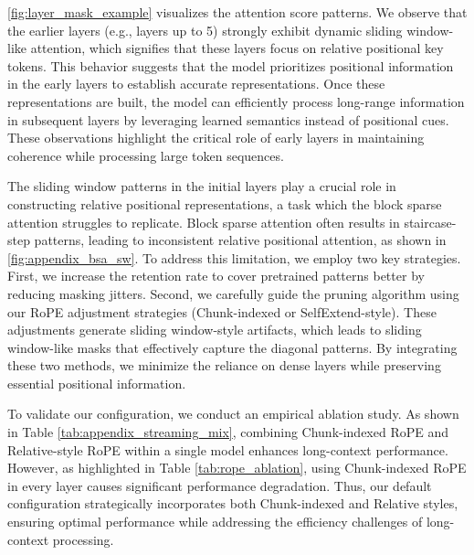 

\cref{fig:layer_mask_example} visualizes the attention score patterns. We observe that the earlier layers (e.g., layers up to 5) strongly exhibit dynamic sliding window-like attention, which signifies that these layers focus on relative positional key tokens. This behavior suggests that the model prioritizes positional information in the early layers to establish accurate representations. Once these representations are built, the model can efficiently process long-range information in subsequent layers by leveraging learned semantics instead of positional cues. These observations highlight the critical role of early layers in maintaining coherence while processing large token sequences.



The sliding window patterns in the initial layers play a crucial role in constructing relative positional representations, a task which the block sparse attention struggles to replicate. Block sparse attention often results in staircase-step patterns, leading to inconsistent relative positional attention, as shown in \cref{fig:appendix_bsa_sw}. To address this limitation, we employ two key strategies. First, we increase the retention rate to cover pretrained patterns better by reducing masking jitters. Second, we carefully guide the pruning algorithm using our RoPE adjustment strategies (Chunk-indexed or SelfExtend-style). These adjustments generate sliding window-style artifacts, which leads to sliding window-like masks that effectively capture the diagonal patterns. By integrating these two methods, we minimize the reliance on dense layers while preserving essential positional information.



To validate our configuration, we conduct an empirical ablation study. As shown in Table \cref{tab:appendix_streaming_mix}, combining Chunk-indexed RoPE and Relative-style RoPE within a single model enhances long-context performance. However, as highlighted in Table \cref{tab:rope_ablation}, using Chunk-indexed RoPE in every layer causes significant performance degradation. Thus, our default configuration strategically incorporates both Chunk-indexed and Relative styles, ensuring optimal performance while addressing the efficiency challenges of long-context processing.


